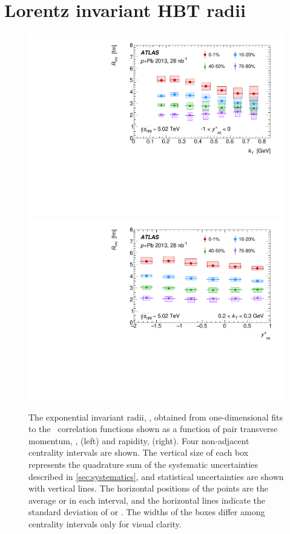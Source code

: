 \FloatBarrier
\section{Lorentz invariant HBT radii}
\label{sec:invariant_results}

\begin{figure}[t]
\centering
\includegraphics[width=0.49\linewidth]{canqinv_R_vs_kt.pdf}
\includegraphics[width=0.49\linewidth]{canqinv_R_vs_kys.pdf}
\caption{The exponential invariant radii, \Rinv, obtained from one-dimensional fits to
the \qinv\ correlation functions shown as a function of pair transverse momentum, \kt, (left) and rapidity, \kys (right). Four non-adjacent centrality intervals are shown. The vertical size of each box represents the quadrature sum of the systematic uncertainties described in \cref{sec:systematics}, and statistical uncertainties are shown with vertical lines. The horizontal positions of the points are the average \kt or \kys in each interval, and the horizontal lines indicate the standard deviation of \kt or \kys. The widths of the boxes differ among centrality intervals only for visual clarity.}
\label{fig:results_Rinv_kt}
\end{figure}
